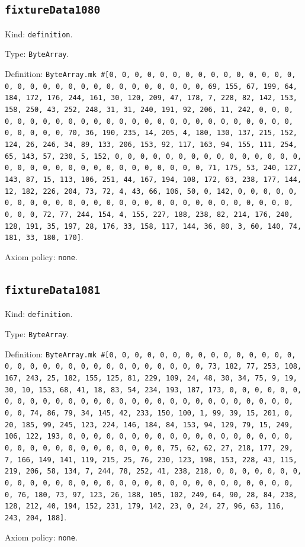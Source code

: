 \documentclass[11pt]{article}
\begin{document}
\subsection*{\texttt{fixtureData1080}}
\noindent Kind: \texttt{definition}.\par
\noindent Type: \texttt{ByteArray}.\par
\noindent Definition: \texttt{ByteArray.mk \#[0, 0, 0, 0, 0, 0, 0, 0, 0, 0, 0, 0, 0, 0, 0, 0, 0, 0, 0, 0, 0, 0, 0, 0, 0, 0, 0, 0, 0, 0, 0, 69, 155, 67, 199, 64, 184, 172, 176, 244, 161, 30, 120, 209, 47, 178, 7, 228, 82, 142, 153, 158, 250, 43, 252, 248, 31, 31, 240, 191, 92, 206, 11, 242, 0, 0, 0, 0, 0, 0, 0, 0, 0, 0, 0, 0, 0, 0, 0, 0, 0, 0, 0, 0, 0, 0, 0, 0, 0, 0, 0, 0, 0, 0, 0, 70, 36, 190, 235, 14, 205, 4, 180, 130, 137, 215, 152, 124, 26, 246, 34, 89, 133, 206, 153, 92, 117, 163, 94, 155, 111, 254, 65, 143, 57, 230, 5, 152, 0, 0, 0, 0, 0, 0, 0, 0, 0, 0, 0, 0, 0, 0, 0, 0, 0, 0, 0, 0, 0, 0, 0, 0, 0, 0, 0, 0, 0, 0, 0, 71, 175, 53, 240, 127, 143, 87, 15, 113, 106, 251, 44, 167, 194, 108, 172, 63, 238, 177, 144, 12, 182, 226, 204, 73, 72, 4, 43, 66, 106, 50, 0, 142, 0, 0, 0, 0, 0, 0, 0, 0, 0, 0, 0, 0, 0, 0, 0, 0, 0, 0, 0, 0, 0, 0, 0, 0, 0, 0, 0, 0, 0, 0, 0, 72, 77, 244, 154, 4, 155, 227, 188, 238, 82, 214, 176, 240, 128, 191, 35, 197, 28, 176, 33, 158, 117, 144, 36, 80, 3, 60, 140, 74, 181, 33, 180, 170]}.\par
\noindent Axiom policy: \texttt{none}.\par
\subsection*{\texttt{fixtureData1081}}
\noindent Kind: \texttt{definition}.\par
\noindent Type: \texttt{ByteArray}.\par
\noindent Definition: \texttt{ByteArray.mk \#[0, 0, 0, 0, 0, 0, 0, 0, 0, 0, 0, 0, 0, 0, 0, 0, 0, 0, 0, 0, 0, 0, 0, 0, 0, 0, 0, 0, 0, 0, 0, 73, 182, 77, 253, 108, 167, 243, 25, 182, 155, 125, 81, 229, 109, 24, 48, 30, 34, 75, 9, 19, 30, 10, 153, 68, 41, 18, 83, 54, 234, 193, 187, 173, 0, 0, 0, 0, 0, 0, 0, 0, 0, 0, 0, 0, 0, 0, 0, 0, 0, 0, 0, 0, 0, 0, 0, 0, 0, 0, 0, 0, 0, 0, 0, 74, 86, 79, 34, 145, 42, 233, 150, 100, 1, 99, 39, 15, 201, 0, 20, 185, 99, 245, 123, 224, 146, 184, 84, 153, 94, 129, 79, 15, 249, 106, 122, 193, 0, 0, 0, 0, 0, 0, 0, 0, 0, 0, 0, 0, 0, 0, 0, 0, 0, 0, 0, 0, 0, 0, 0, 0, 0, 0, 0, 0, 0, 0, 0, 75, 62, 62, 27, 218, 177, 29, 7, 166, 149, 141, 119, 215, 25, 76, 230, 123, 198, 153, 228, 43, 115, 219, 206, 58, 134, 7, 244, 78, 252, 41, 238, 218, 0, 0, 0, 0, 0, 0, 0, 0, 0, 0, 0, 0, 0, 0, 0, 0, 0, 0, 0, 0, 0, 0, 0, 0, 0, 0, 0, 0, 0, 0, 0, 76, 180, 73, 97, 123, 26, 188, 105, 102, 249, 64, 90, 28, 84, 238, 128, 212, 40, 194, 152, 231, 179, 142, 23, 0, 24, 27, 96, 63, 116, 243, 204, 188]}.\par
\noindent Axiom policy: \texttt{none}.\par
\end{document}
